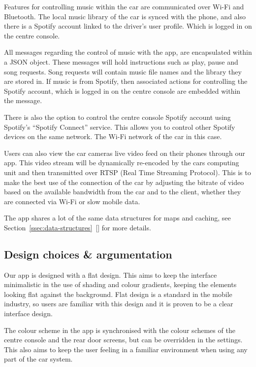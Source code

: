 \documentclass{article}
\begin{document}
Features for controlling music within the car are communicated over Wi-Fi and Bluetooth. The local music library of the car is synced with the phone, and also there is a Spotify account linked to the driver's user profile. Which is logged in on the centre console.

All messages regarding the control of music with the app, are encapsulated within a JSON object. These messages will hold instructions such as play, pause and song requests. Song requests will contain music file names and the library they are stored in.
If music is from Spotify, then associated actions for controlling the Spotify account, which is logged in on the centre console are embedded within the message.

There is also the option to control the centre console Spotify account using Spotify's ``Spotify Connect'' service. This allows you to control other Spotify devices on the same network. The Wi-Fi network of the car in this case.

Users can also view the car cameras live video feed on their phones through our app. This video stream will be dynamically re-encoded by the cars computing unit and then transmitted over RTSP (Real Time Streaming Protocol). This is to make the best use of the connection of the car by adjusting the bitrate of video based on the available bandwidth from the car and to the client, whether they are connected via Wi-Fi or slow mobile data.

The app shares a lot of the same data structures for maps and caching, see Section~\ref{ssec:data-structures}~[] for more details.

\subsection{Design choices \& argumentation}\label{ssec:app-design}


Our app is designed with a flat design. This aims to keep the interface minimalistic in the use of shading and colour gradients, keeping the elements looking flat against the background. Flat design is a standard in the mobile industry, so users are familiar with this design and it is proven to be a clear interface design.

The colour scheme in the app is synchronised with the colour schemes of the centre console and the rear door screens, but can be overridden in the settings. This also aims to keep the user feeling in a familiar environment when using any part of the car system.
\end{document}
